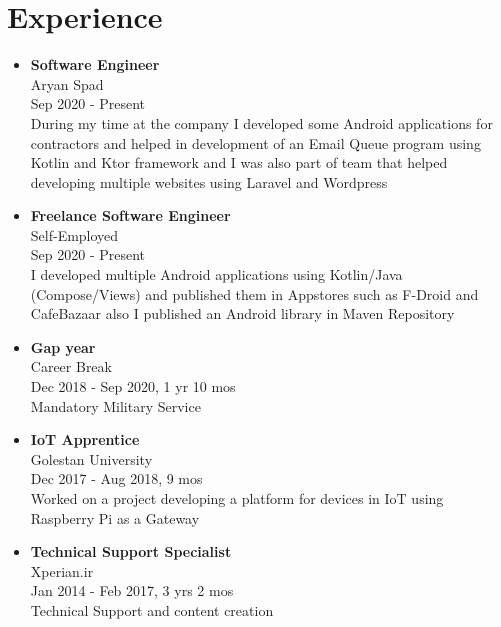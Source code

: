 \section*{\LARGE{Experience}}
\begin{itemize}
    \item \large{\textbf{Software Engineer}\\Aryan Spad\\}\normalsize{Sep 2020 - Present\\During my time at the company I developed some Android applications for contractors and helped in development of an Email Queue program using Kotlin and Ktor framework and I was also part of team that helped developing multiple websites using Laravel and Wordpress}
    \item \large{\textbf{Freelance Software Engineer}\\Self-Employed\\}\normalsize{Sep 2020 - Present\\I developed multiple Android applications using Kotlin/Java (Compose/Views) and published them in Appstores such as F-Droid and CafeBazaar also I published an Android library in Maven Repository}
    \item \large{\textbf{Gap year}\\Career Break\\}\normalsize{Dec 2018 - Sep 2020}, 1 yr 10 mos\\ Mandatory Military Service
    \item \large{\textbf{IoT Apprentice}\\Golestan University\\}\normalsize{Dec 2017 - Aug 2018, 9 mos\\Worked on a project developing a platform for devices in IoT using Raspberry Pi as a Gateway}
    \item \large{\textbf{Technical Support Specialist}\\Xperian.ir\\}\normalsize{Jan 2014 - Feb 2017, 3 yrs 2 mos\\Technical Support and content creation}
\end{itemize}